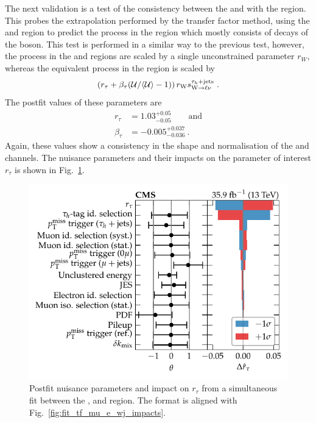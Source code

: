 The next validation is a test of the consistency between the \muplusjets and \eleplusjets with the \tauplusjets region. This probes the extrapolation performed by the transfer factor method, using the \muplusjets and \eleplusjets region to predict the \IWj process in the \metplusjets region which mostly consists of \Ptauh decays of the \PW boson. This test is performed in a similar way to the previous test, however, the \IWj process in the \muplusjets and \eleplusjets regions are scaled by a single unconstrained parameter $r_W$, whereas the equivalent process in the \tauplusjets region is scaled by
%
\begin{equation}
    \left(r_\tau + \beta_\tau (\mathcal{U}/\langle \mathcal{U} \rangle - 1)\right) r_\PW s_{\IWlv}^{\tauplusjets}\ .
\end{equation}
%
The postfit values of these parameters are
%
\begin{align}
    r_\tau & = 1.03^{+0.05}_{-0.05}\qquad\mathrm{and} \nonumber\\
    \beta_\tau & = -0.005^{+0.037}_{-0.036}\ .
\end{align}
%
Again, these values show a consistency in the shape and normalisation of the \muplusjets and \tauplusjets channels. The nuisance parameters and their impacts on the parameter of interest $r_\tau$ is shown in Fig.~\ref{fig:fit_tf_mue_t_wj_impacts}.
%
\begin{figure}[htb]
    \centering
    \includegraphics{chapters/042_backgrounds/images/impacts_tfmue2twj.pdf}
    \caption[Nuisance parameters from a fit with the transfer factor method from the muon and electron control regions to the $\tau$-lepton validation region.]{
        Postfit nuisance parameters and impact on $r_\tau$ from a simultaneous fit between the \muplusjets, \eleplusjets and \tauplusjets region. The format is aligned with Fig.~\ref{fig:fit_tf_mu_e_wj_impacts}.
    }
    \label{fig:fit_tf_mue_t_wj_impacts}
\end{figure}
